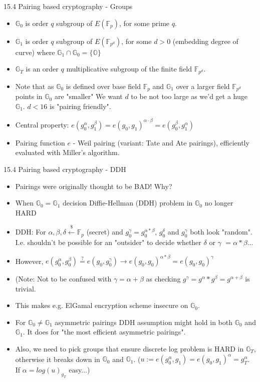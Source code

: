 \documentclass[aspectratio=169,xcolor=dvipsnames]{beamer}
\newcommand{\Go}{\mathbb{G}_0}
\newcommand{\Gi}{\mathbb{G}_1}
\newcommand{\Gt}{\mathbb{G}_T}
\begin{document}
    \begin{frame}{15.4 Pairing based cryptography - Groups}
        \begin{itemize}
            \item $\Go$ is order $q$ subgroup of $E(\mathbb{F}_p)$, for some prime $q$.
            \item $\Gi$ is order $q$ subgroup of $E(\mathbb{F}_{p^d})$, for some $d > 0$ (embedding degree of curve) where $\Gi \cap \Go = \{\mathbb{O}\}$
            \item $\Gt$ is an order $q$ multiplicative subgroup of the finite field $\mathbb{F}_{p^d}$.
            \item Note that as $\Go$ is defined over base field $\mathbb{F}_p$ and $\Gi$ over a larger field $\mathbb{F}_{p^d}$ points in $\Go$ are "smaller" We want $d$ to be not too large as we'd get a huge $\Gi$. $d < 16$ is "pairing friendly".
            \item Central property: $e(g_{0}^{\alpha}, g_{1}^{\beta}) = e(g_0, g_1)^{\alpha \cdot \beta} = e(g_{0}^{\beta}, g_{1}^{\alpha})$
            \item Pairing function $e$ - Weil pairing (variant: Tate and Ate pairings), efficiently evaluated with Miller's algorithm.
        \end{itemize}
    \end{frame}

    \begin{frame}{15.4 Pairing based cryptography - DDH}
        \begin{itemize}
            \item Pairings were originally thought to be BAD! Why?
            \item When $\Go = \Gi$ decision Diffie-Hellman (DDH) problem in $\Go$ no longer HARD
            \item DDH: For $\alpha, \beta, \delta \overset{{\scriptscriptstyle\$}}{\leftarrow} \mathbb{F}_p$ (secret) and $g_{0}^\gamma = g_{0}^{\alpha * \beta}$, $g_{0}^\delta$ and $g_{0}^\gamma$ both look "random". I.e. shouldn't be possible for an "outsider" to decide whether  $\delta$ or $\gamma$ $ = \alpha * \beta$...
            \item However, $e(g_{0}^\alpha, g_{0}^\beta) \overset{?}{=} e(g_{0}, g_{0}^\gamma) \rightarrow e(g_0, g_0)^{\alpha * \beta} = e(g_0, g_0)^\gamma$
            \item (Note: Not to be confused with $\gamma = \alpha + \beta$ as checking $g^\gamma = g^\alpha * g^\beta = g^{\alpha + \beta}$ is trivial.
            \item This makes e.g. ElGamal encryption scheme insecure on $\Go$.
            \item For $\Go \neq \Gi$ asymmetric pairings DDH assumption might hold in both $\Go$ and $\Gi$. It does for "the most efficient asymmetric pairings".
            \item Also, we need to pick groups that ensure discrete log problem is HARD in $\Gt$, otherwise it breaks down in $\Go$ and $\Gi$. ($u := e(g_{0}^\alpha, g_1) = e(g_0, g_1)^\alpha = g_{T}^\alpha$. If $\alpha = log(u)_{g_T}$ easy...)
        \end{itemize}   
    \end{frame}
\end{document}
